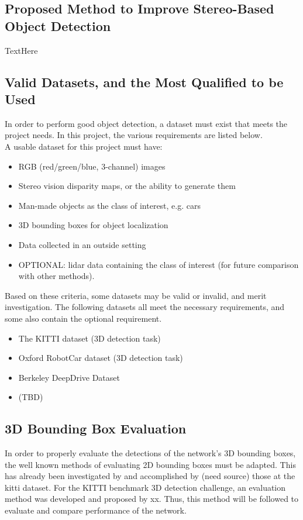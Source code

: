 \subsection{Proposed Method to Improve Stereo-Based Object Detection}
TextHere


\subsection{Valid Datasets, and the Most Qualified to be Used}
In order to perform good object detection, a dataset must exist that meets the project needs. In this project, the various requirements are listed below. \\

A usable dataset for this project must have: 
\begin{itemize} \itemsep=-0.5em
    \item RGB (red/green/blue, 3-channel) images
    \item Stereo vision disparity maps, or the ability to generate them
    \item Man-made objects as the class of interest, e.g. cars
    \item 3D bounding boxes for object localization
    \item Data collected in an outside setting
    \item OPTIONAL: lidar data containing the class of interest (for future comparison with other methods).
\end{itemize}

Based on these criteria, some datasets may be valid or invalid, and merit investigation. The following datasets all meet the necessary requirements, and some also contain the optional requirement.
\begin{itemize} \itemsep=-0.5em
    \item The KITTI dataset (3D detection task)
    \item Oxford RobotCar dataset (3D detection task)
    \item Berkeley DeepDrive Dataset
    \item (TBD)
\end{itemize}


\subsection{3D Bounding Box Evaluation}
In order to properly evaluate the detections of the network's 3D bounding boxes, the well known methods of evaluating 2D bounding boxes must be adapted. This has already been investigated by and accomplished by (need source) those at the kitti dataset. For the KITTI benchmark 3D detection challenge, an evaluation method was developed and proposed by xx. Thus, this method will be followed to evaluate and compare performance of the network. 

